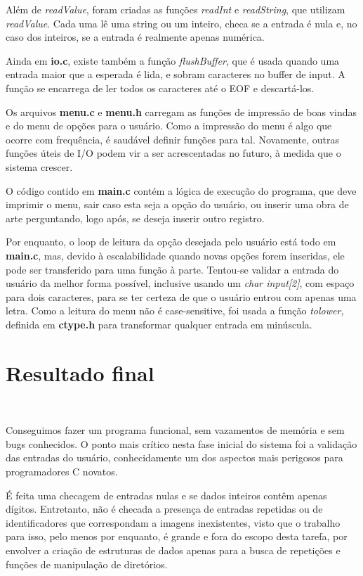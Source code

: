 \documentclass{article}
\begin{document}
Além de \textit{readValue}, foram criadas as funções \textit{readInt} e \textit{readString}, que utilizam \textit{readValue}. Cada uma lê uma string ou um inteiro, checa se a entrada é nula e, no caso dos inteiros, se a entrada é realmente apenas numérica.

Ainda em \textbf{io.c}, existe também a função \textit{flushBuffer}, que é usada quando uma entrada maior que a esperada é lida, e sobram caracteres no buffer de input. A função se encarrega de ler todos os caracteres até o EOF e descartá-los.

Os arquivos \textbf{menu.c} e \textbf{menu.h} carregam as funções de impressão de boas vindas e do menu de opções para o usuário. Como a impressão do menu é algo que ocorre com frequência, é saudável definir funções para tal. Novamente, outras funções úteis de I/O podem vir a ser acrescentadas no futuro, à medida que o sistema crescer.

O código contido em \textbf{main.c} contém a lógica de execução do programa, que deve imprimir o menu, sair caso esta seja a opção do usuário, ou inserir uma obra de arte perguntando, logo após, se deseja inserir outro registro.

Por enquanto, o loop de leitura da opção desejada pelo usuário está todo em \textbf{main.c}, mas, devido à escalabilidade quando novas opções forem inseridas, ele pode ser transferido para uma função à parte. Tentou-se validar a entrada do usuário da melhor forma possível, inclusive usando um \textit{char input[2]}, com espaço para dois caracteres, para se ter certeza de que o usuário entrou com apenas uma letra. Como a leitura do menu não é case-sensitive, foi usada a função \textit{tolower}, definida em \textbf{ctype.h} para transformar qualquer entrada em minúscula.

\section{Resultado final}\

Conseguimos fazer um programa funcional, sem vazamentos de memória e sem bugs conhecidos. O ponto mais crítico nesta fase inicial do sistema foi a validação das entradas do usuário, conhecidamente um dos aspectos mais perigosos para programadores C novatos.

É feita uma checagem de entradas nulas e se dados inteiros contêm apenas dígitos. Entretanto, não é checada a presença de entradas repetidas ou de identificadores que correspondam a imagens inexistentes, visto que o trabalho para isso, pelo menos por enquanto, é grande e fora do escopo desta tarefa, por envolver a criação de estruturas de dados apenas para a busca de repetições e funções de manipulação de diretórios.
\end{document}
